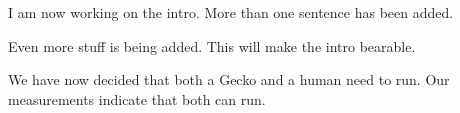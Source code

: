 I am now working on the intro. More than one sentence has been added.

Even more stuff is being added. This will make the intro bearable.

We have now decided that both a Gecko and a human need to run. Our measurements indicate that both can run.